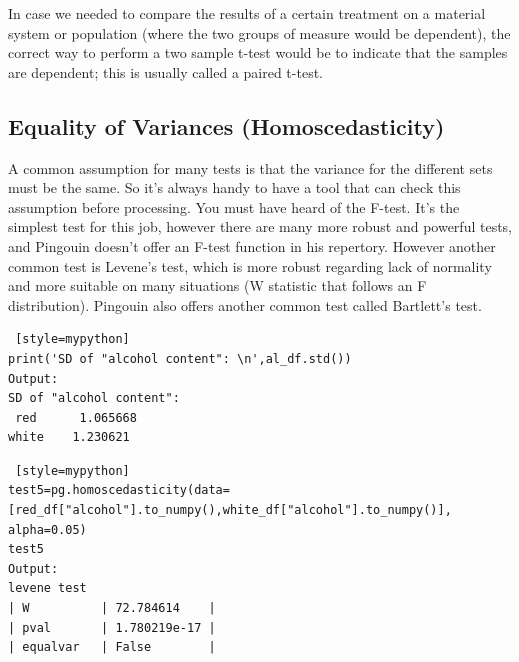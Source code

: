 In case we needed to compare the results of a certain treatment on a material system or population (where the two groups of measure would be dependent), the correct way to perform a two sample t-test would be to indicate that the samples are dependent; this is usually called a paired t-test.


\subsection{Equality of Variances (Homoscedasticity)}
A common assumption for many tests is that the variance for the different sets must be the same. So it's always handy to have a tool that can check this assumption before processing. You must have heard of the F-test. It's the simplest test for this job, however there are many more robust and powerful tests, and Pingouin doesn't offer an F-test function in his repertory. However another common test is Levene's test, which is more robust regarding lack of normality and more suitable on many situations (W statistic that follows an F distribution). Pingouin also offers another common test called Bartlett's test.

\begin{lstlisting} [style=mypython]
print('SD of "alcohol content": \n',al_df.std())
Output:
SD of "alcohol content": 
 red      1.065668
white    1.230621
\end{lstlisting}

\begin{lstlisting} [style=mypython]
test5=pg.homoscedasticity(data=[red_df["alcohol"].to_numpy(),white_df["alcohol"].to_numpy()], alpha=0.05)
test5
Output:
levene test
| W          | 72.784614    |
| pval       | 1.780219e-17 |
| equalvar   | False        |
\end{lstlisting}


